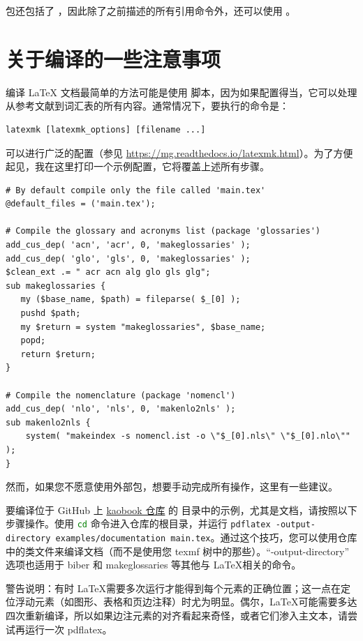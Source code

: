  包还包括了 ，因此除了之前描述的所有引用命令外，还可以使用 。

\section[注意事项]{关于编译的一些注意事项}

编译 LaTeX 文档最简单的方法可能是使用  脚本，因为如果配置得当，它可以处理从参考文献到词汇表的所有内容。通常情况下，要执行的命令是：

\begin{lstlisting}
latexmk [latexmk_options] [filename ...]
\end{lstlisting}

 可以进行广泛的配置（参见 \url{https://mg.readthedocs.io/latexmk.html}）。为了方便起见，我在这里打印一个示例配置，它将覆盖上述所有步骤。

\begin{lstlisting}
# By default compile only the file called 'main.tex'
@default_files = ('main.tex');

# Compile the glossary and acronyms list (package 'glossaries')
add_cus_dep( 'acn', 'acr', 0, 'makeglossaries' );
add_cus_dep( 'glo', 'gls', 0, 'makeglossaries' );
$clean_ext .= " acr acn alg glo gls glg";
sub makeglossaries {
   my ($base_name, $path) = fileparse( $_[0] );
   pushd $path;
   my $return = system "makeglossaries", $base_name;
   popd;
   return $return;
}

# Compile the nomenclature (package 'nomencl')
add_cus_dep( 'nlo', 'nls', 0, 'makenlo2nls' );
sub makenlo2nls {
    system( "makeindex -s nomencl.ist -o \"$_[0].nls\" \"$_[0].nlo\"" );
}
\end{lstlisting}

然而，如果您不愿意使用外部包，想要手动完成所有操作，这里有一些建议。

要编译位于 GitHub 上 \href{https://github.com/fmarotta/kaobook}{kaobook 仓库} 的  目录中的示例，尤其是文档，请按照以下步骤操作。使用 \lstinline[language=bash]|cd| 命令进入仓库的根目录，并运行 \lstinline|pdflatex -output-directory examples/documentation main.tex|。通过这个技巧，您可以使用仓库中的类文件来编译文档（而不是使用您 texmf 树中的那些）。\enquote{-output-directory} 选项也适用于 biber 和 makeglossaries 等其他与 \LaTeX 相关的命令。

警告说明：有时 \LaTeX 需要多次运行才能得到每个元素的正确位置；这一点在定位浮动元素（如图形、表格和页边注释）时尤为明显。偶尔，\LaTeX 可能需要多达四次重新编译，所以如果边注元素的对齐看起来奇怪，或者它们渗入主文本，请尝试再运行一次 pdflatex。
